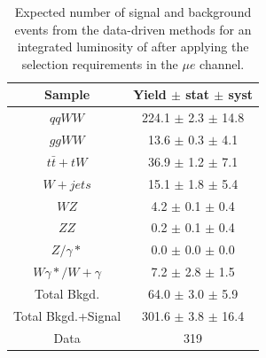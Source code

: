 \begin{table}[ht!]
  \begin{center}
  \begin{tabular} {|c|c|}
\hline
Sample                & Yield $\pm$ stat $\pm$ syst \\ \hline \hline
$qqWW$                & 224.1 $\pm$  2.3 $\pm$ 14.8  \\ \hline
$ggWW$                & 13.6 $\pm$  0.3 $\pm$  4.1  \\ \hline
$t\bar{t} + tW$      & 36.9 $\pm$  1.2 $\pm$  7.1  \\ \hline
$W+jets$              & 15.1 $\pm$  1.8 $\pm$  5.4  \\ \hline
$WZ$             &  4.2 $\pm$  0.1 $\pm$  0.4  \\ \hline
$ZZ$             &  0.2 $\pm$  0.1 $\pm$  0.4  \\ \hline
$Z/\gamma*$          &  0.0 $\pm$  0.0 $\pm$  0.0  \\ \hline
$W\gamma*/W+\gamma$ &  7.2 $\pm$  2.8 $\pm$  1.5  \\ \hline \hline
Total Bkgd.           & 64.0 $\pm$  3.0 $\pm$  5.9  \\ \hline \hline
Total Bkgd.+Signal    & 301.6 $\pm$  3.8 $\pm$ 16.4  \\ \hline \hline
Data                  & 319 \\ \hline
\end{tabular}
  \caption{Expected number of signal and background events from the data-driven methods for
  an integrated luminosity of \intlumi after applying the selection requirements in the $\mu e$ channel.}
   \label{tab:data_yields_me}
  \end{center}
\end{table}


